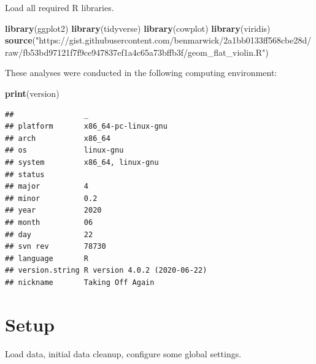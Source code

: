 \documentclass[
]{book}
\newenvironment{Shaded}{\begin{snugshade}}{\end{snugshade}}
\newcommand{\KeywordTok}[1]{\textcolor[rgb]{0.13,0.29,0.53}{\textbf{#1}}}
\newcommand{\NormalTok}[1]{#1}
\newcommand{\StringTok}[1]{\textcolor[rgb]{0.31,0.60,0.02}{#1}}
\begin{document}
Load all required R libraries.

\begin{Shaded}
\begin{Highlighting}[]
\KeywordTok{library}\NormalTok{(ggplot2)}
\KeywordTok{library}\NormalTok{(tidyverse)}
\KeywordTok{library}\NormalTok{(cowplot)}
\KeywordTok{library}\NormalTok{(viridis)}
\KeywordTok{source}\NormalTok{(}\StringTok{"https://gist.githubusercontent.com/benmarwick/2a1bb0133ff568cbe28d/raw/fb53bd97121f7f9ce947837ef1a4c65a73bffb3f/geom\_flat\_violin.R"}\NormalTok{)}
\end{Highlighting}
\end{Shaded}

These analyses were conducted in the following computing environment:

\begin{Shaded}
\begin{Highlighting}[]
\KeywordTok{print}\NormalTok{(version)}
\end{Highlighting}
\end{Shaded}

\begin{verbatim}
##                _                           
## platform       x86_64-pc-linux-gnu         
## arch           x86_64                      
## os             linux-gnu                   
## system         x86_64, linux-gnu           
## status                                     
## major          4                           
## minor          0.2                         
## year           2020                        
## month          06                          
## day            22                          
## svn rev        78730                       
## language       R                           
## version.string R version 4.0.2 (2020-06-22)
## nickname       Taking Off Again
\end{verbatim}

\hypertarget{setup}{%
\section{Setup}\label{setup}}

Load data, initial data cleanup, configure some global settings.
\end{document}
